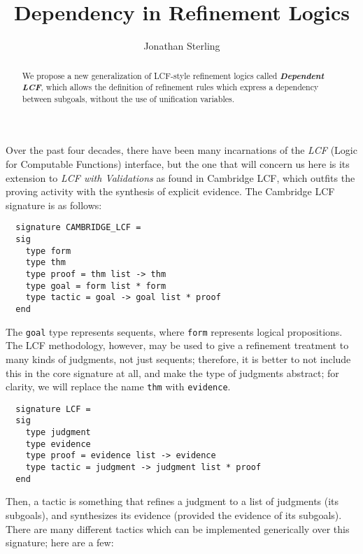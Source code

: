 \documentclass[11pt]{article}
\theoremstyle{definition}
\theoremstyle{remark}
\numberwithin{equation}{section}
\newcommand\DepLCF{\textbf{\emph{Dependent LCF}}}
\begin{document}
\title{Dependency in Refinement Logics}
\date{}
\author{Jonathan Sterling}
\maketitle

\begin{abstract}

  We propose a new generalization of LCF-style refinement logics called \DepLCF,
  which allows the definition of refinement rules which express a dependency
  between subgoals, without the use of unification variables.

\end{abstract}

Over the past four decades, there have been many incarnations of the \emph{LCF}
(Logic for Computable Functions) interface, but the one that will concern us
here is its extension to \emph{LCF with Validations} as found in Cambridge LCF,
which outfits the proving activity with the synthesis of explicit evidence.
The Cambridge LCF signature is as follows:


\begin{lstlisting}
  signature CAMBRIDGE_LCF =
  sig
    type form
    type thm
    type proof = thm list -> thm
    type goal = form list * form
    type tactic = goal -> goal list * proof
  end
\end{lstlisting}

The \verb!goal! type represents sequents, where \verb!form! represents logical
propositions. The LCF methodology, however, may be used to give a refinement
treatment to many kinds of judgments, not just sequents; therefore, it
is better to not include this in the core signature at all, and make the
type of judgments abstract; for clarity, we will replace the name \verb!thm!
with \verb!evidence!.

\begin{lstlisting}
  signature LCF =
  sig
    type judgment
    type evidence
    type proof = evidence list -> evidence
    type tactic = judgment -> judgment list * proof
  end
\end{lstlisting}

Then, a tactic is something that refines a judgment to a list of judgments (its
subgoals), and synthesizes its evidence (provided the evidence of its
subgoals). There are many different tactics which can be implemented
generically over this signature; here are a few:
\end{document}
